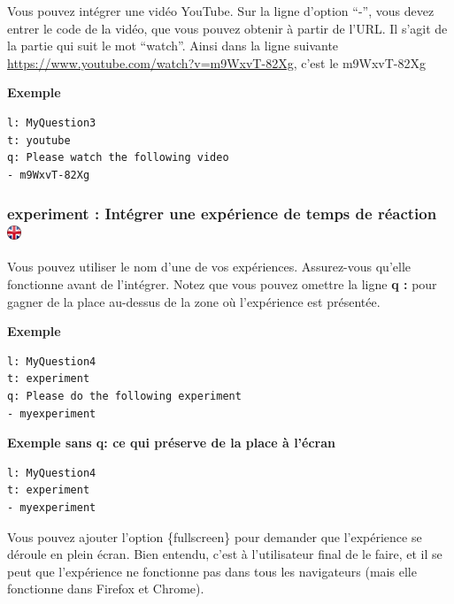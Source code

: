 \documentclass[
]{book}
\begin{document}
Vous pouvez intégrer une vidéo YouTube. Sur la ligne d'option ``-'',
vous devez entrer le code de la vidéo, que vous pouvez obtenir à partir
de l'URL. Il s'agit de la partie qui suit le mot ``watch''. Ainsi dans
la ligne suivante \url{https://www.youtube.com/watch?v=m9WxvT-82Xg},
c'est le m9WxvT-82Xg

\textbf{Exemple}

\begin{verbatim}
l: MyQuestion3
t: youtube
q: Please watch the following video
- m9WxvT-82Xg
\end{verbatim}

\hypertarget{experiment-intuxe9grer-une-expuxe9rience-de-temps-de-ruxe9action-ukflag}{%
\subsubsection[experiment : Intégrer une expérience de temps de réaction
]{\texorpdfstring{experiment : Intégrer une expérience de temps de
réaction
\href{https://www.psytoolkit.org/doc3.1.0/online-survey-syntax.html\#experiment}{\protect\includegraphics{img/ukflag.png}}}{experiment : Intégrer une expérience de temps de réaction ukflag}}\label{experiment-intuxe9grer-une-expuxe9rience-de-temps-de-ruxe9action-ukflag}}

Vous pouvez utiliser le nom d'une de vos expériences. Assurez-vous
qu'elle fonctionne avant de l'intégrer. Notez que vous pouvez omettre la
ligne \textbf{q :} pour gagner de la place au-dessus de la zone où
l'expérience est présentée.

\textbf{Exemple}

\begin{verbatim}
l: MyQuestion4
t: experiment
q: Please do the following experiment
- myexperiment
\end{verbatim}

\textbf{Exemple sans q: ce qui préserve de la place à l'écran}

\begin{verbatim}
l: MyQuestion4
t: experiment
- myexperiment
\end{verbatim}

Vous pouvez ajouter l'option \{fullscreen\} pour demander que
l'expérience se déroule en plein écran. Bien entendu, c'est à
l'utilisateur final de le faire, et il se peut que l'expérience ne
fonctionne pas dans tous les navigateurs (mais elle fonctionne dans
Firefox et Chrome).
\end{document}
